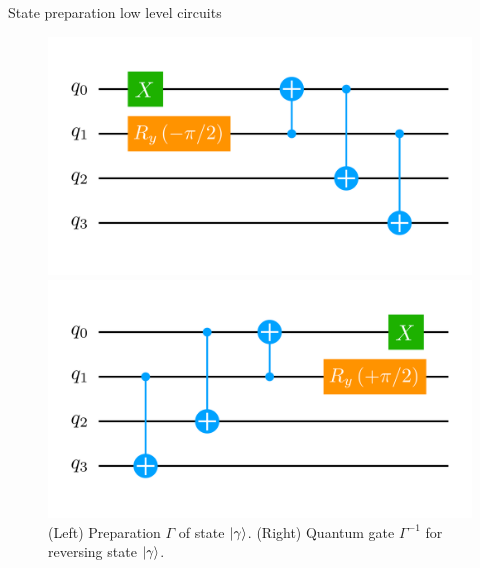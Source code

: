 \documentclass[9pt, handout, aspectratio=169]{beamer}	%
\begin{document}
\begin{frame}[allowframebreaks]{State preparation low level circuits}

	\begin{figure}[!p]
		\centering
		\begin{minipage}[c]{.45\linewidth}
			\centering
			\includegraphics[width=\linewidth]{Figures/NJL1-model-solving/ansatz-implementation-base-state-preparation-gamma}
		\end{minipage}
	  \hspace{.025\linewidth}
		\begin{minipage}[c]{.45\linewidth}
			\centering
			\includegraphics[width=\linewidth]{Figures/NJL1-model-solving/ansatz-implementation-base-state-reversing-gamma}
		\end{minipage}
		\caption{(Left) Preparation $\Gamma$ of state $\ket{\gamma}$. (Right) Quantum gate $\Gamma^{-1}$ for reversing state $\ket{\gamma}$.}
	\end{figure}

\break


\end{frame}
\end{document}
